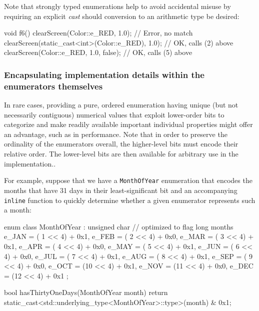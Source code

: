 Note that strongly typed enumerations help to avoid accidental misuse by
requiring an explicit \emph{cast} should conversion to an arithmetic
type be desired:

\begin{emcppslisting}
void f6()
{
    clearScreen(Color::e_RED, 1.0);                   // Error, no match
    clearScreen(static_cast<int>(Color::e_RED), 1.0); // OK, calls (2) above
    clearScreen(Color::e_RED, 1.0, false);            // OK, calls (5) above
}
\end{emcppslisting}


\subsubsection[Encapsulating implementation details within the enumerators themselves]{Encapsulating implementation details within the enumerators themselves}\label{encapsulating-implementation-details-within-the-enumerators-themselves}

In rare cases, providing a pure, ordered enumeration having unique (but
not necessarily contiguous) numerical values that exploit lower-order
bits to categorize and make readily available important
individual properties might offer an advantage, such as in performance. Note that in order to preserve the ordinality of the enumerators
overall, the higher-level bits must encode their relative order. The
lower-level bits are then available for arbitrary use in the
  implementation..

For example, suppose that we have a \texttt{MonthOfYear} enumeration
that encodes the months that have 31 days in their least-significant bit
and an accompanying \texttt{inline} function to quickly determine
whether a given enumerator represents such a month:

\begin{emcppslisting}
enum class MonthOfYear : unsigned char  // optimized to flag long months
{
    e_JAN = ( 1 << 4) + 0x1,
    e_FEB = ( 2 << 4) + 0x0,
    e_MAR = ( 3 << 4) + 0x1,
    e_APR = ( 4 << 4) + 0x0,
    e_MAY = ( 5 << 4) + 0x1,
    e_JUN = ( 6 << 4) + 0x0,
    e_JUL = ( 7 << 4) + 0x1,
    e_AUG = ( 8 << 4) + 0x1,
    e_SEP = ( 9 << 4) + 0x0,
    e_OCT = (10 << 4) + 0x1,
    e_NOV = (11 << 4) + 0x0,
    e_DEC = (12 << 4) + 0x1
};

bool hasThirtyOneDays(MonthOfYear month)
{
    return static_cast<std::underlying_type<MonthOfYear>::type>(month) & 0x1;
}
\end{emcppslisting}

